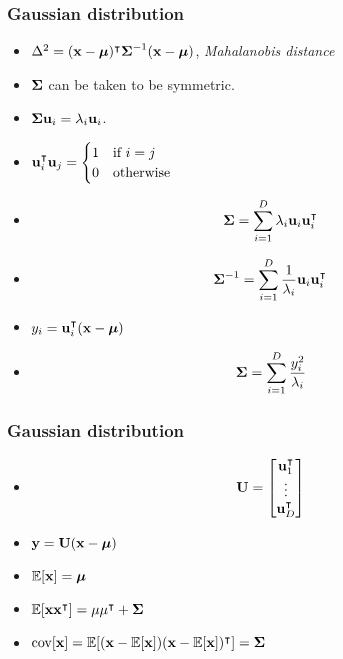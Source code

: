 \documentclass[10pt,mathserif]{beamer}
\begin{document}
\begin{frame}
\frametitle{Gaussian distribution}
\begin{itemize}
\item $\Delta^2 = (\mathbf{x}-\boldsymbol{\mu})^\intercal \boldsymbol{\Sigma}^{-1} (\mathbf{x} - \boldsymbol{\mu})$, \textit{Mahalanobis distance}
\item $\boldsymbol{\Sigma}$ can be taken to be symmetric.
\item $\boldsymbol{\Sigma} \mathbf{u}_i = \lambda_i \mathbf{u}_i$.
\item $\mathbf{u}_i^\intercal \mathbf{u}_j = \begin{cases} 1 &\text{if $i=j$}\\ 0 &\text{otherwise}\end{cases}$
\item 
\begin{align}
    \boldsymbol{\Sigma} = \sum_{i=1}^D \lambda_i \mathbf{u}_i \mathbf{u}_i^\intercal\nonumber
\end{align}
\item 
\begin{align}
    \boldsymbol{\Sigma}^{-1} = \sum_{i=1}^D \frac{1}{\lambda_i} \mathbf{u}_i \mathbf{u}_i^\intercal\nonumber
\end{align}
\item
$y_i = \mathbf{u}_i^\intercal(\mathbf{x} - \boldsymbol{\mu})$
\item 
\begin{align}
    \boldsymbol{\Sigma} = \sum_{i=1}^D \frac{y_i^2}{\lambda_i} \nonumber
\end{align}
\end{itemize}
\end{frame}

\begin{frame}
\frametitle{Gaussian distribution}
\begin{itemize}
\item
\begin{align}
\mathbf{U} = 
\begin{bmatrix} 
\mathbf{u}_1^\intercal\\
\vdots\\
\mathbf{u}_D^\intercal\\
\end{bmatrix}\nonumber
\end{align}
\item $\mathbf{y} = \mathbf{U} (\mathbf{x}-\boldsymbol{\mu})$
\item $\mathbb{E}[\mathbf{x}] = \boldsymbol{\mu}$
\item $\mathbb{E}[\mathbf{x}\mathbf{x}^\intercal] = \mu\mu^\intercal + \boldsymbol{\Sigma}$
\item $\mathrm{cov}[\mathbf{x}] = \mathbb{E}[(\mathbf{x}-\mathbb{E}[\mathbf{x}])(\mathbf{x}-\mathbb{E}[\mathbf{x}])^\intercal] = \boldsymbol{\Sigma}$
\end{itemize}
\end{frame}
\end{document}
